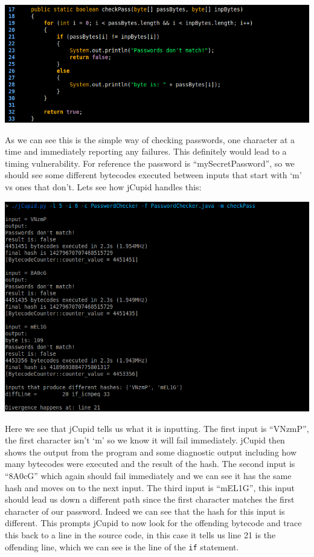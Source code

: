 \begin{center}
  \includegraphics[width=\linewidth]{PasswordChecker}
\end{center}

As we can see this is the simple way of checking passwords, one character at a time and immediately reporting
any failures. This definitely would lead to a timing vulnerability. For reference the password is 
``mySecretPassword'', so we should see some different bytecodes executed between inputs that start with `m'
vs ones that don't. Lets see how jCupid handles this:

\begin{center}
  \includegraphics[width=\linewidth]{jCupidRun1}
\end{center}

Here we see that jCupid tells us what it is inputting. The first input is ``VNzmP'', the first character
isn't `m' so we know it will fail immediately. jCupid then shows the output from the program and some
diagnostic output including how many bytecodes were executed and the result of the hash. The second input
is ``8A0cG'' which again should fail immediately and we can see it has the same hash and moves on to the
next input. The third input is ``mEL1G'', this input should lead us down a different path since the first
character matches the first character of our password. Indeed we can see that the hash for this input is
different. This prompts jCupid to now look for the offending bytecode and trace this back to a line in 
the source code, in this case it tells us line 21 is the offending line, which we can see is the line of
the \texttt{if} statement.

